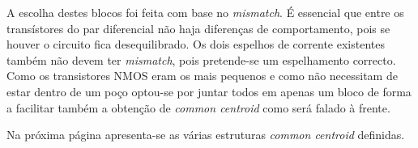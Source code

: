 \documentclass[11pt]{article}
\numberwithin{equation}{section}
\begin{document}
A escolha destes blocos foi feita com base no \textit{mismatch}. É essencial que entre os transístores do par diferencial não haja diferenças de comportamento, pois se houver o circuito fica desequilibrado. Os dois espelhos de corrente existentes também não devem ter \textit{mismatch}, pois pretende-se um espelhamento correcto. Como os transistores NMOS eram os mais pequenos e como não necessitam de estar dentro de um poço optou-se por juntar todos em apenas um bloco de forma a facilitar também a obtenção de \textit{common centroid} como será falado à frente.

Na próxima página apresenta-se as várias estruturas \textit{common centroid} definidas.

\begin{figure}[H]
	\centering
	\hspace{8mm}
	\linebreak
	\hspace{40mm}

\end{figure}
\end{document}
